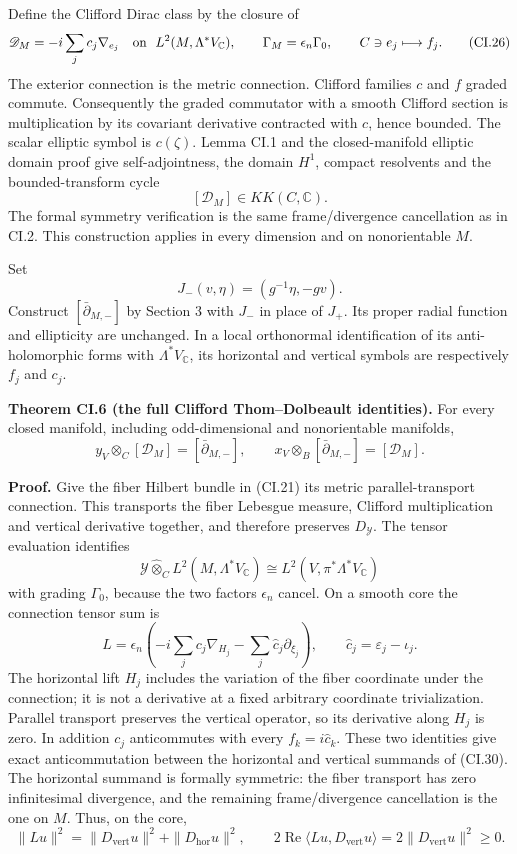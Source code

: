 \documentclass[
  11pt,
]{article}
\begin{document}
Define the Clifford Dirac class by the closure of \[
 \mathscr D_M=-i\sum_j c_j\nabla_{e_j}
 \quad\hbox{on }\ L^2(M,\Lambda^*V_{\mathbb C}),\qquad
 \Gamma_M=\epsilon_n\Gamma_0,\qquad C\ni e_j\longmapsto f_j.
 \tag{CI.26}
\] The exterior connection is the metric connection. Clifford families
\(c\) and \(f\) graded commute. Consequently the graded commutator with
a smooth Clifford section is multiplication by its covariant derivative
contracted with \(c\), hence bounded. The scalar elliptic symbol is
\(c(\zeta)\). Lemma CI.1 and the closed-manifold elliptic domain proof
give self-adjointness, the domain \(H^1\), compact resolvents and the
bounded-transform cycle \[
 [\mathscr D_M]\in KK(C,\mathbb C).
 \tag{CI.27}
\] The formal symmetry verification is the same frame/divergence
cancellation as in CI.2. This construction applies in every dimension
and on nonorientable \(M\).

Set \[
 J_-(v,\eta)=(g^{-1}\eta,-gv).
 \tag{CI.28}
\] Construct \([\bar\partial_{M,-}]\) by Section 3 with \(J_-\) in place
of \(J_+\). Its proper radial function and ellipticity are unchanged. In
a local orthonormal identification of its anti-holomorphic forms with
\(\Lambda^*V_{\mathbb C}\), its horizontal and vertical symbols are
respectively \(f_j\) and \(c_j\).

\textbf{Theorem CI.6 (the full Clifford Thom--Dolbeault identities).}
For every closed manifold, including odd-dimensional and nonorientable
manifolds, \[
 y_V\otimes_C[\mathscr D_M]=[\bar\partial_{M,-}],
 \qquad
 x_V\otimes_B[\bar\partial_{M,-}]=[\mathscr D_M].
 \tag{CI.29}
\]

\textbf{Proof.} Give the fiber Hilbert bundle in (CI.21) its metric
parallel-transport connection. This transports the fiber Lebesgue
measure, Clifford multiplication and vertical derivative together, and
therefore preserves \(D_{\mathcal Y}\). The tensor evaluation identifies
\[
 \mathcal Y\widehat\otimes_C L^2(M,\Lambda^*V_{\mathbb C})
       \cong L^2(V,\pi^*\Lambda^*V_{\mathbb C})
\] with grading \(\Gamma_0\), because the two factors \(\epsilon_n\)
cancel. On a smooth core the connection tensor sum is \[
 L=\epsilon_n\left(-i\sum_jc_j\nabla_{H_j}
                         -\sum_j\widehat c_j\partial_{\xi_j}\right),
 \qquad \widehat c_j=\varepsilon_j-\iota_j .
 \tag{CI.30}
\] The horizontal lift \(H_j\) includes the variation of the fiber
coordinate under the connection; it is not a derivative at a fixed
arbitrary coordinate trivialization. Parallel transport preserves the
vertical operator, so its derivative along \(H_j\) is zero. In addition
\(c_j\) anticommutes with every \(f_k=i\widehat c_k\). These two
identities give exact anticommutation between the horizontal and
vertical summands of (CI.30). The horizontal summand is formally
symmetric: the fiber transport has zero infinitesimal divergence, and
the remaining frame/divergence cancellation is the one on \(M\). Thus,
on the core, \[
 \|Lu\|^2=\|D_{\mathrm{vert}}u\|^2+\|D_{\mathrm{hor}}u\|^2,\qquad
 2\operatorname{Re}\langle Lu,D_{\mathrm{vert}}u\rangle
          =2\|D_{\mathrm{vert}}u\|^2\geq0.
 \tag{CI.31}
\]
\end{document}

